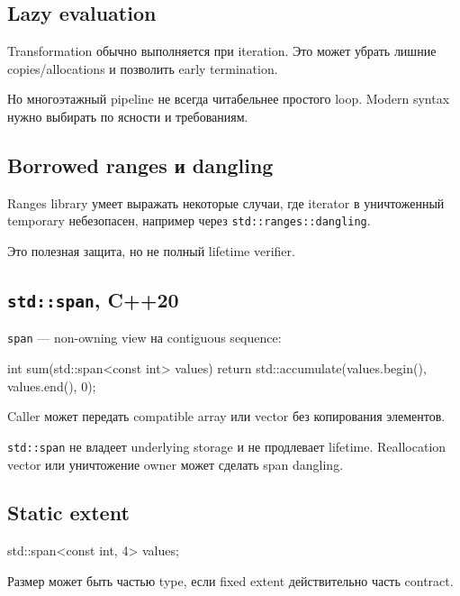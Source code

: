 \subsection{Lazy evaluation}

Transformation обычно выполняется при iteration. Это может убрать лишние
copies/allocations и позволить early termination.

Но многоэтажный pipeline не всегда читабельнее простого loop. Modern syntax
нужно выбирать по ясности и требованиям.

\subsection{Borrowed ranges и dangling}

Ranges library умеет выражать некоторые случаи, где iterator в уничтоженный
temporary небезопасен, например через \texttt{std::ranges::dangling}.

Это полезная защита, но не полный lifetime verifier.

\subsection{\texttt{std::span}, C++20}

\texttt{span} --- non-owning view на contiguous sequence:

\begin{cppcode}
int sum(std::span<const int> values) {
    return std::accumulate(values.begin(), values.end(), 0);
}
\end{cppcode}

Caller может передать compatible array или vector без копирования элементов.

\begin{importantbox}
\texttt{std::span} не владеет underlying storage и не продлевает lifetime.
Reallocation vector или уничтожение owner может сделать span dangling.
\end{importantbox}

\subsection{Static extent}

\begin{cppcode}
std::span<const int, 4> values;
\end{cppcode}

Размер может быть частью type, если fixed extent действительно часть contract.

